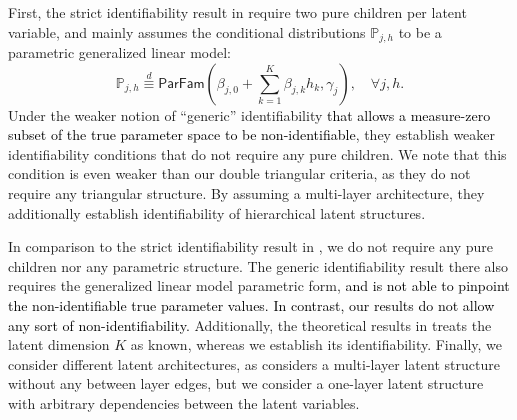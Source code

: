 \documentclass[10pt]{article} %
\newcommand{\PP}{\mathbb P}
\newcommand{\blue}[1]{\textcolor{black}{#1}}
\begin{document}
First, the strict identifiability result in \cite{lee2025deep} require two pure children per latent variable, and mainly assumes the conditional distributions $\PP_{j,h}$ to be a parametric generalized linear model:
$$\PP_{j,h} \stackrel{d}{\equiv} \textsf{ParFam}(\beta_{j,0} + \sum_{k=1}^K \beta_{j,k} h_k, \gamma_j), \quad \forall j, h.$$
Under the weaker notion of ``generic'' identifiability \blue{that allows a measure-zero subset of the true parameter space to be non-identifiable}, they establish weaker identifiability conditions that do not require any pure children. We note that this condition is even weaker than our double triangular criteria, as they do not require any triangular structure. By assuming a multi-layer architecture, they additionally establish identifiability of hierarchical latent structures.

In comparison to the strict identifiability result in \cite{lee2025deep}, we do not require any pure children nor any parametric structure. The generic identifiability result there also requires the generalized linear model parametric form, \blue{and is not able to pinpoint the non-identifiable true parameter values.
%
In contrast, our results do not allow any sort of non-identifiability.}
%
Additionally, the theoretical results in \cite{lee2025deep} treats the latent dimension $K$ as known, whereas we establish its identifiability. Finally, we consider different latent architectures, as \cite{lee2025deep} considers a multi-layer latent structure without any between layer edges, but we consider a one-layer latent structure with arbitrary dependencies between the latent variables.

%
\end{document}
